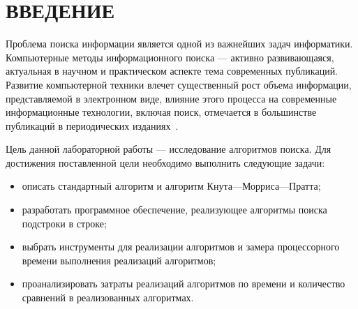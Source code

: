 \chapter*{ВВЕДЕНИЕ}

Проблема поиска информации является одной из важнейших задач информатики.
Компьютерные методы информационного поиска --- активно развивающаяся, актуальная в научном и практическом аспекте тема современных публикаций. 
Развитие компьютерной техники влечет существенный рост объема информации, представляемой в электронном виде, влияние этого процесса на современные информационные технологии, включая поиск, отмечается в большинстве публикаций в периодических изданиях~\cite{intro}.



Цель данной лабораторной работы --- исследование алгоритмов поиска.
Для достижения поставленной цели необходимо выполнить следующие задачи:
\begin{itemize}
	\item описать стандартный алгоритм и алгоритм Кнута---Морриса---Пратта;
	\item разработать программное обеспечение, реализующее алгоритмы поиска подстроки в строке;
	\item выбрать инструменты для реализации алгоритмов и замера процессорного времени выполнения реализаций алгоритмов;
	\item проанализировать затраты реализаций алгоритмов по времени и количество сравнений в реализованных алгоритмах.
\end{itemize}
